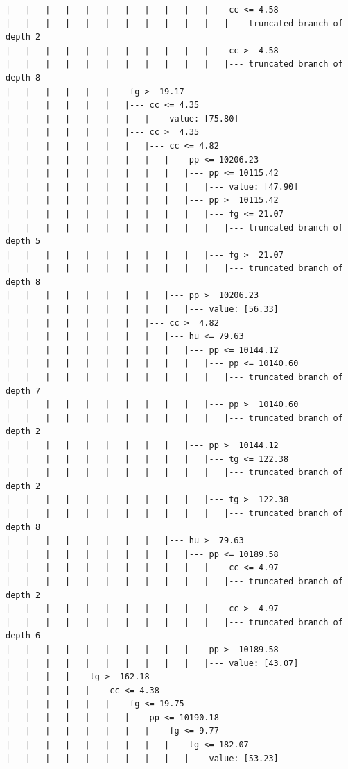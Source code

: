 \documentclass[UTF8, a4paper]{ctexart}
\begin{document}
\begin{lstlisting}
|   |   |   |   |   |   |   |   |   |   |--- cc <= 4.58
|   |   |   |   |   |   |   |   |   |   |   |--- truncated branch of depth 2
|   |   |   |   |   |   |   |   |   |   |--- cc >  4.58
|   |   |   |   |   |   |   |   |   |   |   |--- truncated branch of depth 8
|   |   |   |   |   |--- fg >  19.17
|   |   |   |   |   |   |--- cc <= 4.35
|   |   |   |   |   |   |   |--- value: [75.80]
|   |   |   |   |   |   |--- cc >  4.35
|   |   |   |   |   |   |   |--- cc <= 4.82
|   |   |   |   |   |   |   |   |--- pp <= 10206.23
|   |   |   |   |   |   |   |   |   |--- pp <= 10115.42
|   |   |   |   |   |   |   |   |   |   |--- value: [47.90]
|   |   |   |   |   |   |   |   |   |--- pp >  10115.42
|   |   |   |   |   |   |   |   |   |   |--- fg <= 21.07
|   |   |   |   |   |   |   |   |   |   |   |--- truncated branch of depth 5
|   |   |   |   |   |   |   |   |   |   |--- fg >  21.07
|   |   |   |   |   |   |   |   |   |   |   |--- truncated branch of depth 8
|   |   |   |   |   |   |   |   |--- pp >  10206.23
|   |   |   |   |   |   |   |   |   |--- value: [56.33]
|   |   |   |   |   |   |   |--- cc >  4.82
|   |   |   |   |   |   |   |   |--- hu <= 79.63
|   |   |   |   |   |   |   |   |   |--- pp <= 10144.12
|   |   |   |   |   |   |   |   |   |   |--- pp <= 10140.60
|   |   |   |   |   |   |   |   |   |   |   |--- truncated branch of depth 7
|   |   |   |   |   |   |   |   |   |   |--- pp >  10140.60
|   |   |   |   |   |   |   |   |   |   |   |--- truncated branch of depth 2
|   |   |   |   |   |   |   |   |   |--- pp >  10144.12
|   |   |   |   |   |   |   |   |   |   |--- tg <= 122.38
|   |   |   |   |   |   |   |   |   |   |   |--- truncated branch of depth 2
|   |   |   |   |   |   |   |   |   |   |--- tg >  122.38
|   |   |   |   |   |   |   |   |   |   |   |--- truncated branch of depth 8
|   |   |   |   |   |   |   |   |--- hu >  79.63
|   |   |   |   |   |   |   |   |   |--- pp <= 10189.58
|   |   |   |   |   |   |   |   |   |   |--- cc <= 4.97
|   |   |   |   |   |   |   |   |   |   |   |--- truncated branch of depth 2
|   |   |   |   |   |   |   |   |   |   |--- cc >  4.97
|   |   |   |   |   |   |   |   |   |   |   |--- truncated branch of depth 6
|   |   |   |   |   |   |   |   |   |--- pp >  10189.58
|   |   |   |   |   |   |   |   |   |   |--- value: [43.07]
|   |   |   |--- tg >  162.18
|   |   |   |   |--- cc <= 4.38
|   |   |   |   |   |--- fg <= 19.75
|   |   |   |   |   |   |--- pp <= 10190.18
|   |   |   |   |   |   |   |--- fg <= 9.77
|   |   |   |   |   |   |   |   |--- tg <= 182.07
|   |   |   |   |   |   |   |   |   |--- value: [53.23]

\end{lstlisting}
\end{document}
